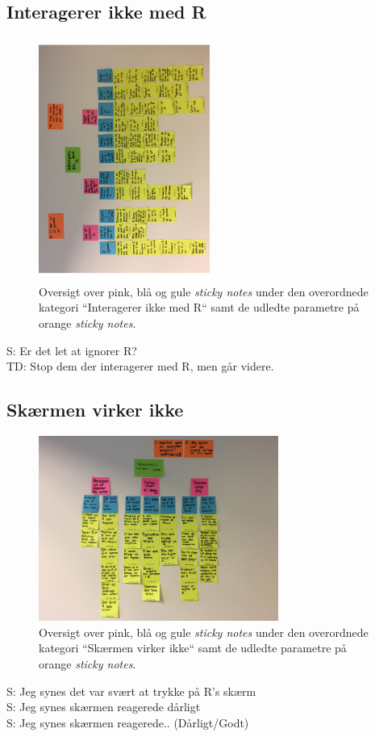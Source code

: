 \subsection{Interagerer ikke med R}
%
\begin{figure}[H]
\centering
\includegraphics[width = 0.5\textwidth, angle = -90]{Figure/AffinityDiagram/InteragererIkkeMedR} 
\caption{Oversigt over pink, blå og gule \textit{sticky notes} under den overordnede kategori ``Interagerer ikke med R`` samt de udledte parametre på orange \textit{sticky notes}.}
\label{fig:AFInteragererIkkeMedR}
\end{figure}
\noindent
%
S: Er det let at ignorer R?\\
TD: Stop dem der interagerer med R, men går videre. 
\subsection{Skærmen virker ikke}
%
\begin{figure}[H]
\centering
\includegraphics[width = 0.7\textwidth]{Figure/AffinityDiagram/SkaermenVirkerIkke} 
\caption{Oversigt over pink, blå og gule \textit{sticky notes} under den overordnede kategori ``Skærmen virker ikke`` samt de udledte parametre på orange \textit{sticky notes}.}
\label{fig:AFSkaermVirkerIkke}
\end{figure}
\noindent
%
S: Jeg synes det var svært at trykke på R's skærm\\
S: Jeg synes skærmen reagerede dårligt\\
S: Jeg synes skærmen reagerede.. (Dårligt/Godt)
%
